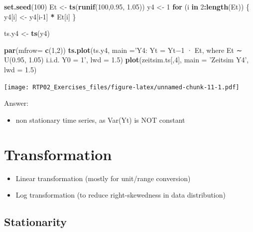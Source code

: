 \documentclass[
]{article}
\newenvironment{Shaded}{\begin{snugshade}}{\end{snugshade}}
\newcommand{\ControlFlowTok}[1]{\textcolor[rgb]{0.13,0.29,0.53}{\textbf{#1}}}
\newcommand{\DataTypeTok}[1]{\textcolor[rgb]{0.13,0.29,0.53}{#1}}
\newcommand{\DecValTok}[1]{\textcolor[rgb]{0.00,0.00,0.81}{#1}}
\newcommand{\FloatTok}[1]{\textcolor[rgb]{0.00,0.00,0.81}{#1}}
\newcommand{\KeywordTok}[1]{\textcolor[rgb]{0.13,0.29,0.53}{\textbf{#1}}}
\newcommand{\NormalTok}[1]{#1}
\newcommand{\OperatorTok}[1]{\textcolor[rgb]{0.81,0.36,0.00}{\textbf{#1}}}
\newcommand{\StringTok}[1]{\textcolor[rgb]{0.31,0.60,0.02}{#1}}
\providecommand{\tightlist}{%
  \setlength{\itemsep}{0pt}\setlength{\parskip}{0pt}}
\begin{document}
\begin{Shaded}
\begin{Highlighting}[]
\KeywordTok{set.seed}\NormalTok{(}\DecValTok{100}\NormalTok{)}
\NormalTok{Et <-}\StringTok{ }\KeywordTok{ts}\NormalTok{(}\KeywordTok{runif}\NormalTok{(}\DecValTok{100}\NormalTok{,}\FloatTok{0.95}\NormalTok{, }\FloatTok{1.05}\NormalTok{))}
\NormalTok{y4 <-}\StringTok{ }\DecValTok{1}
\ControlFlowTok{for}\NormalTok{ (i }\ControlFlowTok{in} \DecValTok{2}\OperatorTok{:}\KeywordTok{length}\NormalTok{(Et)) \{}
\NormalTok{  y4[i] <-}\StringTok{ }\NormalTok{y4[i}\DecValTok{-1}\NormalTok{] }\OperatorTok{*}\StringTok{ }\NormalTok{Et[i]}
\NormalTok{\}}

\NormalTok{ts.y4 <-}\StringTok{ }\KeywordTok{ts}\NormalTok{(y4)}

\KeywordTok{par}\NormalTok{(}\DataTypeTok{mfrow=} \KeywordTok{c}\NormalTok{(}\DecValTok{1}\NormalTok{,}\DecValTok{2}\NormalTok{))}
\KeywordTok{ts.plot}\NormalTok{(ts.y4, }\DataTypeTok{main =}\StringTok{'Y4: Yt = Yt−1 · Et, where Et ∼ U(0.95, 1.05) i.i.d. Y0 = 1'}\NormalTok{, }\DataTypeTok{lwd =} \FloatTok{1.5}\NormalTok{)}
\KeywordTok{plot}\NormalTok{(zeitsim.ts[,}\DecValTok{4}\NormalTok{], }\DataTypeTok{main =} \StringTok{'Zeitsim Y4'}\NormalTok{, }\DataTypeTok{lwd =} \FloatTok{1.5}\NormalTok{)}
\end{Highlighting}
\end{Shaded}

\texttt{[image: RTP02\_Exercises\_files/figure-latex/unnamed-chunk-11-1.pdf]}

Answer:

\begin{itemize}
\tightlist
\item
  non stationary time series, as Var(Yt) is NOT constant
\end{itemize}

\hypertarget{transformation}{%
\section{Transformation}\label{transformation}}

\begin{itemize}
\item
  Linear transformation (mostly for unit/range conversion)
\item
  Log transformation (to reduce right-skewedness in data distribution)
\end{itemize}

\hypertarget{stationarity}{%
\subsection{Stationarity}\label{stationarity}}
\end{document}
